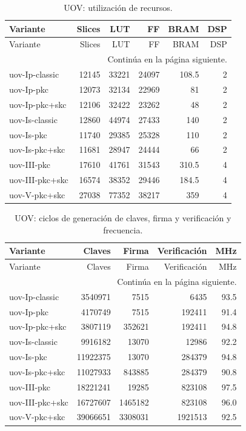 \begingroup
\small
\setlength{\tabcolsep}{3pt}
\setlength{\LTcapwidth}{\textwidth}
\begin{longtable}{lrrrrr}
\caption{UOV: utilización de recursos.}\label{tab:eval-uov-recursos}\\
\toprule
Variante & Slices & LUT & FF & BRAM & DSP \\
\midrule
\endfirsthead
\toprule
Variante & Slices & LUT & FF & BRAM & DSP \\
\midrule
\endhead
\midrule
\multicolumn{6}{r}{\small Continúa en la página siguiente.}\\
\endfoot
\bottomrule
\endlastfoot
{uov-Ip-classic} & {12145} & {33221} & {24097} & {108.5} & {2} \\
{uov-Ip-pkc} & {12073} & {32134} & {22969} & {81} & {2} \\
{uov-Ip-pkc+skc} & {12106} & {32422} & {23262} & {48} & {2} \\
{uov-Is-classic} & {12860} & {44974} & {27433} & {140} & {2} \\
{uov-Is-pkc} & {11740} & {29385} & {25328} & {110} & {2} \\
{uov-Is-pkc+skc} & {11681} & {28947} & {24444} & {66} & {2} \\
{uov-III-pkc} & {17610} & {41761} & {31543} & {310.5} & {4} \\
{uov-III-pkc+skc} & {16574} & {38352} & {29446} & {184.5} & {4} \\
{uov-V-pkc+skc} & {27038} & {77352} & {38217} & {359} & {4} \\
\end{longtable}
\endgroup
\begingroup
\small
\setlength{\tabcolsep}{3pt}
\setlength{\LTcapwidth}{\textwidth}
\begin{longtable}{lrrrr}
\caption{UOV: ciclos de generación de claves, firma y verificación y frecuencia.}\label{tab:eval-uov-tiempos}\\
\toprule
Variante & Claves & Firma & Verificación & MHz \\
\midrule
\endfirsthead
\toprule
Variante & Claves & Firma & Verificación & MHz \\
\midrule
\endhead
\midrule
\multicolumn{5}{r}{\small Continúa en la página siguiente.}\\
\endfoot
\bottomrule
\endlastfoot
{uov-Ip-classic} & {3540971} & {7515} & {6435} & {93.5} \\
{uov-Ip-pkc} & {4170749} & {7515} & {192411} & {91.4} \\
{uov-Ip-pkc+skc} & {3807119} & {352621} & {192411} & {94.8} \\
{uov-Is-classic} & {9916182} & {13070} & {12986} & {92.2} \\
{uov-Is-pkc} & {11922375} & {13070} & {284379} & {94.8} \\
{uov-Is-pkc+skc} & {11027933} & {843885} & {284379} & {90.8} \\
{uov-III-pkc} & {18221241} & {19285} & {823108} & {97.5} \\
{uov-III-pkc+skc} & {16727607} & {1465182} & {823108} & {96.0} \\
{uov-V-pkc+skc} & {39066651} & {3308031} & {1921513} & {92.5} \\
\end{longtable}
\endgroup



